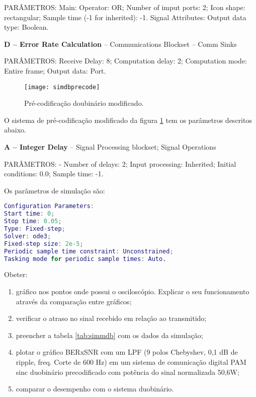 PARÂMETROS: Main: Operator: OR; Number of imput ports: 2; Icon shape: rectangular; Sample time (-1 for inherited): -1. Signal Attributes: Output data type: Boolean.

\textbf{D – Error Rate Calculation} – Communications Blockset – Comm Sinks

PARÂMETROS: Receive Delay: 8; Computation delay: 2; Computation mode: Entire frame; Output data: Port.

\begin{figure}[H]
  \centering
  \caption{Pré-codificação doubinário modificado.}
  \texttt{[image: simdbprecode]}
  \label{fig:simmdbprecode}
\end{figure}

O sistema de pré-codificação modificado da figura \ref{fig:simmdbprecode} tem os parâmetros descritos abaixo.

\textbf{A – Integer Delay} – Signal Processing blockset; Signal Operations

PARÂMETROS: - Number of delays: 2; Input processing: Inherited; Initial conditions: 0.0; Sample time: -1.

Os parâmetros de simulação são:

\begin{lstlisting}[language=matlab]
Configuration Parameters: 
Start time: 0; 
Stop time: 0.05; 
Type: Fixed-step; 
Solver: ode3;  
Fixed-step size: 2e-5; 
Periodic sample time constraint: Unconstrained; 
Tasking mode for periodic sample times: Auto.
\end{lstlisting}

Obeter:
\begin{enumerate}
  \item gráfico nos pontos onde possui o osciloscópio. Explicar o seu funcionamento através da comparação entre gráficos;
  
  \item verificar o atraso no sinal recebido em relação ao transmitido;
  
   \item preencher a tabela \ref{tab:simmdb} com os dados da simulação;
  
  \item plotar o gráfico BERxSNR com um LPF (9 polos Chebyshev, 0,1 dB de ripple, freq. Corte de 600 Hz) em um sistema de comunicação digital PAM sinc duobinário precodificado com potência do sinal normalizada 50,6W;
  
  \item comparar o desempenho com o sistema duobinário.
\end{enumerate}

